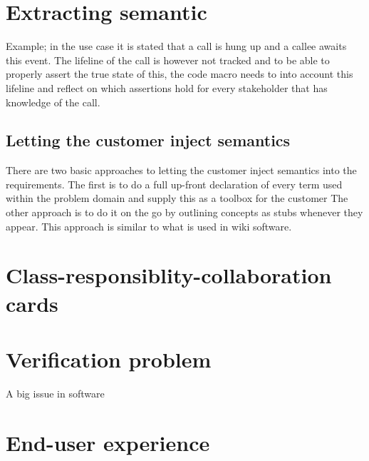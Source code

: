 \documentclass[10pt]{scrreprt}
\begin{document}
\section{Extracting semantic}
Example; in the use case it is stated that a call is hung up and a callee awaits this event. The lifeline of the call is however not tracked and to be able to properly assert the true state of this, the code macro needs to into account this lifeline and reflect on which assertions hold for every stakeholder that has knowledge of the call. %

\subsection{Letting the customer inject semantics}

There are two basic approaches to letting the customer inject semantics into the requirements. The first is to do a full up-front declaration of every term used within the problem domain and supply this as a toolbox for the customer %
The other approach is to do it on the go by outlining concepts as stubs whenever they appear. This approach is similar to what is used in wiki software. %

\section{Class-responsiblity-collaboration cards}

\section{Verification problem}
A big issue in software

\section{End-user experience}
\end{document}
